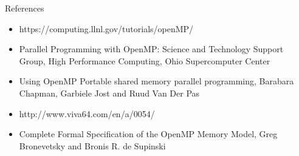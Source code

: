 \documentclass[10pt]{beamer}
\begin{document}




\begin{frame}{References}
\begin{itemize}
\item https://computing.llnl.gov/tutorials/openMP/
\item Parallel Programming with OpenMP: Science and Technology Support Group, High Performance Computing, Ohio Supercomputer Center
\item Using OpenMP Portable shared memory parallel programming, Barabara Chapman, Garbiele Jost and Ruud Van Der Pas
\item http://www.viva64.com/en/a/0054/
\item Complete Formal Specification of the OpenMP Memory Model,
  Greg Bronevetsky and Bronis R. de Supinski
\end{itemize}
\end{frame}
\end{document}

